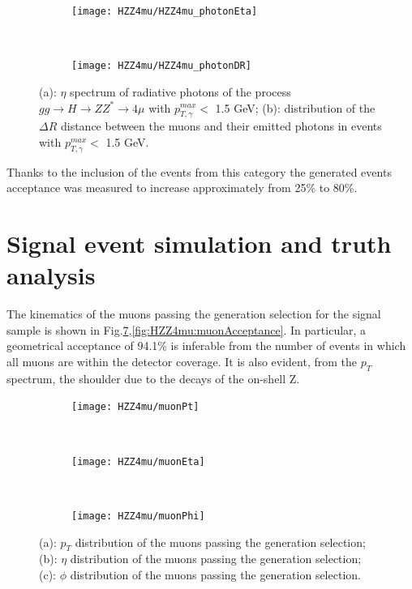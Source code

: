 \documentclass[a4paper,twoside,12pt]{book}
\begin{document}
\begin{figure}
\centering
\begin{subfigure}{\linewidth}
  \centering
  \texttt{[image: HZZ4mu/HZZ4mu\_photonEta]}
  \caption{}
  \label{fig:HZZ4mu:photonEtaAfterCut}
\end{subfigure}\\[1ex]
\begin{subfigure}{\linewidth}
  \centering
  \texttt{[image: HZZ4mu/HZZ4mu\_photonDR]}
  \caption{}
  \label{fig:HZZ4mu:photonDRAfterCut}
\end{subfigure}
\caption{(a): $\eta$ spectrum of radiative photons of the process \\
	 \mbox{$gg \rightarrow H \rightarrow ZZ^* \rightarrow 4\mu$} with $p^{max}_{T, \gamma} <$ 1.5 GeV; 
	(b): distribution of the $\Delta R$ distance between the muons and their emitted photons in events with $p^{max}_{T, \gamma} <$ 1.5 GeV.}
\label{fig:HZZ4mu:genPhotonsAfterCut}
\end{figure}

Thanks to the inclusion of the events from this category the generated events acceptance was measured to increase approximately from 25\% to 80\%.\\

\section{Signal event simulation and truth analysis}

The kinematics of the muons passing the generation selection for the 
signal sample is shown in 
Fig.\ref{fig:HZZ4mu:muonKinematics},\ref{fig:HZZ4mu:muonAcceptance}. In particular, a geometrical acceptance of 94.1\%
is inferable from the number of events in which all muons are within the detector
coverage. It is also evident, from the $p_{T}$ spectrum, the shoulder due to the decays
of the on-shell Z.\\


\begin{figure}
\begin{subfigure}{\linewidth}
\centering
\texttt{[image: HZZ4mu/muonPt]}
\caption{}
\label{fig:HZZ4mu:pt}
\end{subfigure}\\[1ex]
\begin{subfigure}{\linewidth}
\centering
\texttt{[image: HZZ4mu/muonEta]}
\caption{}
\label{fig:HZZ4mu:eta}
\end{subfigure}\\[1 ex]
\begin{subfigure}{\linewidth}
\centering
\texttt{[image: HZZ4mu/muonPhi]}
\caption{}
\label{fig:HZZ4mu:phi}
\end{subfigure}
\caption{(a): $p_T$ distribution of the muons passing the generation selection;\\
	        (b): $\eta$ distribution of the muons passing the generation selection;\\
        	        (c): $\phi$ distribution of the muons passing the generation selection.  }
\label{fig:HZZ4mu:muonKinematics}
\end{figure}
\end{document}
